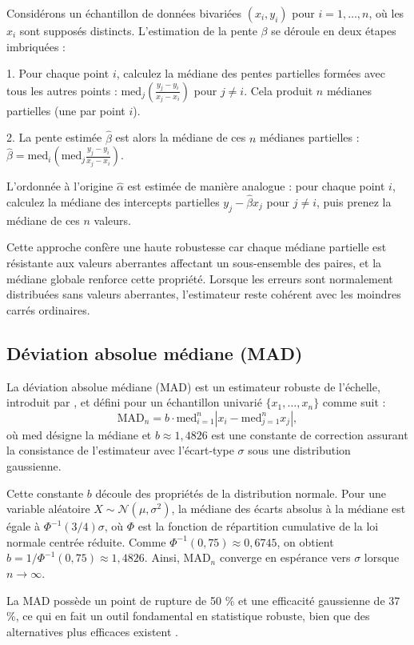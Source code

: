  Considérons un échantillon de données bivariées \((x_i, y_i)\) pour \(i = 1, \dots, n\), où les \(x_i\) sont supposés distincts. L'estimation de la pente \(\beta\) se déroule en deux étapes imbriquées :
 
 1. Pour chaque point \(i\), calculez la médiane des pentes partielles formées avec tous les autres points : \(\text{med}_j \left( \frac{y_j - y_i}{x_j - x_i} \right)\) pour \(j \neq i\). Cela produit \(n\) médianes partielles (une par point \(i\)).
 
 2. La pente estimée \(\hat{\beta}\) est alors la médiane de ces \(n\) médianes partielles : \(\hat{\beta} = \text{med}_i \left( \text{med}_j \frac{y_j - y_i}{x_j - x_i} \right)\).
 
 L'ordonnée à l'origine \(\hat{\alpha}\) est estimée de manière analogue : pour chaque point \(i\), calculez la médiane des intercepts partielles \(y_j - \hat{\beta} x_j\) pour \(j \neq i\), puis prenez la médiane de ces \(n\) valeurs.
 
 Cette approche confère une haute robustesse car chaque médiane partielle est résistante aux valeurs aberrantes affectant un sous-ensemble des paires, et la médiane globale renforce cette propriété. Lorsque les erreurs sont normalement distribuées sans valeurs aberrantes, l'estimateur reste cohérent avec les moindres carrés ordinaires.
 
 \subsection{Déviation absolue médiane (MAD)}
 
 La déviation absolue médiane (MAD) est un estimateur robuste de l'échelle, introduit par \citep{hampel1974influence}, et défini pour un échantillon univarié $\{x_1, \dots, x_n\}$ comme suit :
 \[
 \mathrm{MAD}_n = b \cdot \mathrm{med}_{i=1}^n |x_i - \mathrm{med}_{j=1}^n x_j|,
 \]
 où $\mathrm{med}$ désigne la médiane et $b \approx 1,4826$ est une constante de correction assurant la consistance de l'estimateur avec l'écart-type $\sigma$ sous une distribution gaussienne.
 
 Cette constante $b$ découle des propriétés de la distribution normale. Pour une variable aléatoire $X \sim \mathcal{N}(\mu, \sigma^2)$, la médiane des écarts absolus à la médiane est égale à $\Phi^{-1}(3/4) \sigma$, où $\Phi$ est la fonction de répartition cumulative de la loi normale centrée réduite. Comme $\Phi^{-1}(0,75) \approx 0,6745$, on obtient $b = 1 / \Phi^{-1}(0,75) \approx 1,4826$. Ainsi, $\text{MAD}_n$ converge en espérance vers $\sigma$ lorsque $n \to \infty$.
 
 La MAD possède un point de rupture de 50 \% et une efficacité gaussienne de 37 \%, ce qui en fait un outil fondamental en statistique robuste, bien que des alternatives plus efficaces existent \citep{rousseeuw1993alternatives}.